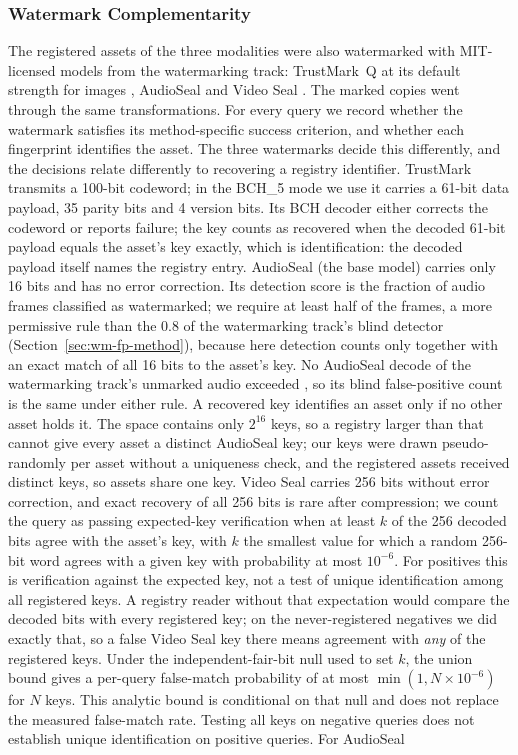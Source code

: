 \subsubsection{Watermark Complementarity}
The registered assets of the three modalities were also watermarked with MIT-licensed models from the watermarking track: TrustMark~Q at its default strength for images \cite{bui2025trustmark}, AudioSeal \cite{sanroman2024audioseal} and Video Seal \cite{fernandez2024videoseal}. The marked copies went through the same transformations. For every query we record whether the watermark satisfies its method-specific success criterion, and whether each fingerprint identifies the asset. The three watermarks decide this differently, and the decisions relate differently to recovering a registry identifier. TrustMark transmits a 100-bit codeword; in the BCH\_5 mode we use it carries a 61-bit data payload, 35 parity bits and 4 version bits. Its BCH decoder either corrects the codeword or reports failure; the key counts as recovered when the decoded 61-bit payload equals the asset's key exactly, which is identification: the decoded payload itself names the registry entry. AudioSeal (the base model) carries only 16 bits and has no error correction. Its detection score is the fraction of audio frames classified as watermarked; we require at least half of the frames, a more permissive rule than the 0.8 of the watermarking track's blind detector (Section~\ref{sec:wm-fp-method}), because here detection counts only together with an exact match of all 16 bits to the asset's key. No AudioSeal decode of the watermarking track's unmarked audio exceeded , so its blind false-positive count is the same under either rule. A recovered key identifies an asset only if no other asset holds it. The space contains only $2^{16}$ keys, so a registry larger than that cannot give every asset a distinct AudioSeal key; our keys were drawn pseudo-randomly per asset without a uniqueness check, and the  registered assets received  distinct keys, so  assets share one key. Video Seal carries 256 bits without error correction, and exact recovery of all 256 bits is rare after compression; we count the query as passing expected-key verification when at least $k$ of the 256 decoded bits agree with the asset's key, with $k$ the smallest value for which a random 256-bit word agrees with a given key with probability at most $10^{-6}$. For positives this is verification against the expected key, not a test of unique identification among all registered keys. A registry reader without that expectation would compare the decoded bits with every registered key; on the never-registered negatives we did exactly that, so a false Video Seal key there means agreement with \emph{any} of the registered keys. Under the independent-fair-bit null used to set $k$, the union bound gives a per-query false-match probability of at most $\min(1,N \times 10^{-6})$ for $N$ keys. This analytic bound is conditional on that null and does not replace the measured false-match rate. Testing all keys on negative queries does not establish unique identification on positive queries. For AudioSeal 